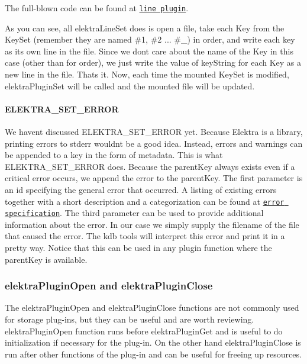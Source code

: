 The full-\/blown code can be found at \href{https://libelektra.org/tree/master/src/plugins/line/line.c}{\tt line plugin}.

As you can see, all {\ttfamily elektra\+Line\+Set} does is open a file, take each {\ttfamily Key} from the {\ttfamily Key\+Set} (remember they are named {\ttfamily \#1}, {\ttfamily \#2} ... {\ttfamily \#\+\_}) in order, and write each key as its own line in the file. Since we don\textquotesingle{}t care about the name of the {\ttfamily Key} in this case (other than for order), we just write the value of {\ttfamily key\+String} for each {\ttfamily Key} as a new line in the file. That\textquotesingle{}s it. Now, each time the mounted {\ttfamily Key\+Set} is modified, {\ttfamily elektra\+Plugin\+Set} will be called and the mounted file will be updated.

\paragraph*{{\ttfamily E\+L\+E\+K\+T\+R\+A\+\_\+\+S\+E\+T\+\_\+\+E\+R\+R\+OR}}

We haven\textquotesingle{}t discussed {\ttfamily E\+L\+E\+K\+T\+R\+A\+\_\+\+S\+E\+T\+\_\+\+E\+R\+R\+OR} yet. Because Elektra is a library, printing errors to stderr wouldn\textquotesingle{}t be a good idea. Instead, errors and warnings can be appended to a key in the form of metadata. This is what {\ttfamily E\+L\+E\+K\+T\+R\+A\+\_\+\+S\+E\+T\+\_\+\+E\+R\+R\+OR} does. Because the parent\+Key always exists even if a critical error occurs, we append the error to the {\ttfamily parent\+Key}. The first parameter is an id specifying the general error that occurred. A listing of existing errors together with a short description and a categorization can be found at \href{https://github.com/ElektraInitiative/libelektra/blob/master/src/error/specification}{\tt error specification}. The third parameter can be used to provide additional information about the error. In our case we simply supply the filename of the file that caused the error. The kdb tools will interpret this error and print it in a pretty way. Notice that this can be used in any plugin function where the parent\+Key is available.

\subsubsection*{{\ttfamily elektra\+Plugin\+Open} and {\ttfamily elektra\+Plugin\+Close}}

The {\ttfamily elektra\+Plugin\+Open} and {\ttfamily elektra\+Plugin\+Close} functions are not commonly used for storage plug-\/ins, but they can be useful and are worth reviewing. {\ttfamily elektra\+Plugin\+Open} function runs before {\ttfamily elektra\+Plugin\+Get} and is useful to do initialization if necessary for the plug-\/in. On the other hand {\ttfamily elektra\+Plugin\+Close} is run after other functions of the plug-\/in and can be useful for freeing up resources.

